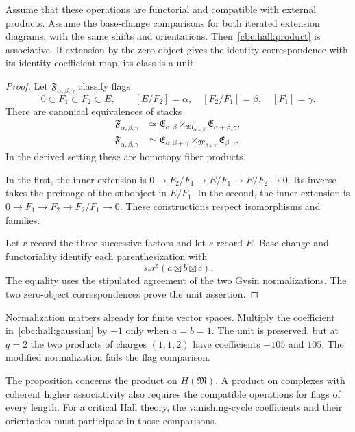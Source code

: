 \begin{proposition}\label{cbc:hall:flags}
Assume that these operations are functorial and compatible with external products.
Assume the base-change comparisons for both iterated extension diagrams, with the same shifts and orientations.
Then~\eqref{cbc:hall:product} is associative.
If extension by the zero object gives the identity correspondence with its identity coefficient map, its class is a unit.
\end{proposition}
\begin{proof}
Let $\mathfrak F_{\alpha,\beta,\gamma}$ classify flags
\[
 0\subset F_1\subset F_2\subset E,
 \qquad
 [E/F_2]=\alpha,\quad [F_2/F_1]=\beta,\quad [F_1]=\gamma.
\]
There are canonical equivalences of stacks
\[
 \begin{aligned}
 \mathfrak F_{\alpha,\beta,\gamma}
 &\simeq
 \mathfrak E_{\alpha,\beta}
  \mathop{\times}_{\mathfrak M_{\alpha+\beta}}
 \mathfrak E_{\alpha+\beta,\gamma},\\
 \mathfrak F_{\alpha,\beta,\gamma}
 &\simeq
 \mathfrak E_{\alpha,\beta+\gamma}
  \mathop{\times}_{\mathfrak M_{\beta+\gamma}}
 \mathfrak E_{\beta,\gamma}.
 \end{aligned}
\]
In the derived setting these are homotopy fiber products.

In the first, the inner extension is $0\to F_2/F_1\to E/F_1\to E/F_2\to0$.
Its inverse takes the preimage of the subobject in $E/F_1$.
In the second, the inner extension is $0\to F_1\to F_2\to F_2/F_1\to0$.
These constructions respect isomorphisms and families.

Let $r$ record the three successive factors and let $s$ record $E$.
Base change and functoriality identify each parenthesization with
\[
 s_*r^\sharp(a\boxtimes b\boxtimes c).
\]
The equality uses the stipulated agreement of the two Gysin normalizations.
The two zero-object correspondences prove the unit assertion.
\end{proof}

Normalization matters already for finite vector spaces.
Multiply the coefficient in~\eqref{cbc:hall:gaussian} by $-1$ only when $a=b=1$.
The unit is preserved, but at $q=2$ the two products of charges $(1,1,2)$ have coefficients $-105$ and $105$.
The modified normalization fails the flag comparison.

The proposition concerns the product on $H(\mathfrak M)$.
A product on complexes with coherent higher associativity also requires the compatible operations for flags of every length.
For a critical Hall theory, the vanishing-cycle coefficients and their orientation must participate in those comparisons.

